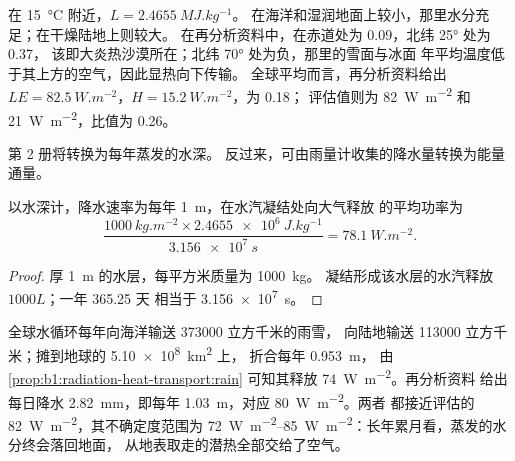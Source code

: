 在 \qty{15}{\celsius} 附近，$L = \qty{2.4655}{MJ.kg^{-1}}$。
在海洋和湿润地面上较小，那里水分充足；在干燥陆地上则较大。
在再分析资料中，在赤道处为 \num{0.09}，北纬 \ang{25} 处为 \num{0.37}，
该即大炎热沙漠所在；北纬 \ang{70} 处为负，那里的雪面与冰面
年平均温度低于其上方的空气，因此显热向下传输。
全球平均而言，再分析资料给出 $LE =
\qty{82.5}{W.m^{-2}}$，$H = \qty{15.2}{W.m^{-2}}$，为 \num{0.18}；
评估值则为 \qty{82}{W.m^{-2}} 和 \qty{21}{W.m^{-2}}，比值为
\num{0.26}。

第 2 册将转换为每年蒸发的水深。
反过来，可由雨量计收集的降水量转换为能量通量。

\begin{proposition}[降水作为能量通量]\label{prop:b1:radiation-heat-transport:rain}
以水深计，降水速率为每年 \qty{1}{m}，在水汽凝结处向大气释放
的平均功率为
\[
  \frac{\qty{1000}{kg.m^{-2}} \times \qty{2.4655e6}{J.kg^{-1}}}{\qty{3.156e7}{s}}
  = \qty{78.1}{W.m^{-2}} .
\]
\end{proposition}

\begin{proof}
厚 \qty{1}{m} 的水层，每平方米质量为 \qty{1000}{kg}。
凝结形成该水层的水汽释放 $1000L$；一年 \num{365.25} 天
相当于 \qty{3.156e7}{s}。
\end{proof}

\begin{example}[作为能量通量的水循环]\label{ex:b1:radiation-heat-transport:rain}
全球水循环每年向海洋输送 \num{373000} 立方千米的雨雪，
向陆地输送 \num{113000} 立方千米；摊到地球的 \qty{5.10e8}{km^2} 上，
折合每年 \qty{0.953}{m}，
由 \cref{prop:b1:radiation-heat-transport:rain} 可知其释放 \qty{74}{W.m^{-2}}。再分析资料
给出每日降水 \qty{2.82}{mm}，即每年 \qty{1.03}{m}，对应 \qty{80}{W.m^{-2}}。两者
都接近评估的 \qty{82}{W.m^{-2}}，其不确定度范围为
\qtyrange{72}{85}{W.m^{-2}}：长年累月看，蒸发的水分终会落回地面，
从地表取走的潜热全部交给了空气。
\end{example}

